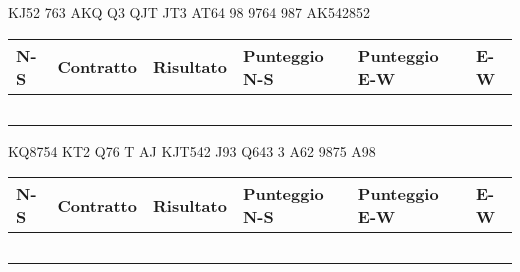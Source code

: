 \documentclass[a4paper,italian,12pt]{article}
\begin{document}
\newpage

\begin{tcolorbox}
\begin{minipage}{.3\textwidth}
\newgame
{}
       {KJ52}  {763}  {AKQ}     
       {Q3}  {QJT}   {JT3}    
     {AT64}    {98}  {9764}    
       {987}  {AK542}{852}       

    \hspace{-.2cm}\showAll
\end{minipage}
\begin{minipage}{.7\textwidth}

\renewcommand{\arraystretch}{2}
\begin{tabular}{|l|l|l|l|l|l|}
\hline
N-S & Contratto\hspace{1.5cm} & Risultato& Punteggio N-S & Punteggio E-W & E-W\\\hline
  &&&&&\\\hline
   &&&&&\\\hline
    &&&&&\\\hline
     &&&&&\\\hline
          &&&&&\\\hline
\end{tabular}
\end{minipage}
\end{tcolorbox}

\medskip

\begin{tcolorbox}
\begin{minipage}{.3\textwidth}
\newgame
{}
     {KQ8754} {KT2} {Q76}
     {T} {AJ} {KJT542}
     {J93} {Q643} {3}
     {A62} {9875} {A98}

    \hspace{-.2cm}\showAll
\end{minipage}
\begin{minipage}{.7\textwidth}

\renewcommand{\arraystretch}{2}
\begin{tabular}{|l|l|l|l|l|l|}
\hline
N-S & Contratto\hspace{1.5cm} & Risultato& Punteggio N-S & Punteggio E-W & E-W\\\hline
  &&&&&\\\hline
   &&&&&\\\hline
    &&&&&\\\hline
     &&&&&\\\hline
          &&&&&\\\hline
\end{tabular}
\end{minipage}
\end{tcolorbox}
\end{document}

